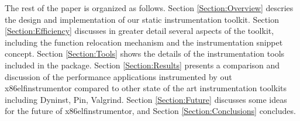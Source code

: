 The rest of the paper is organized as follows. Section
\ref{Section:Overview} descries the design and implementation of our static
instrumentation toolkit. Section \ref{Section:Efficiency} discusses in greater detail
several aspects of the toolkit, including the function relocation mechanism and the
instrumentation snippet concept. Section \ref{Section:Tools} shows the details of
the instrumentation tools included in the package. Section \ref{Section:Results}
presents a comparison and discussion of the performance applications instrumented by out x86elfinstrumentor compared
to other state of the art instrumentation toolkits including Dyninst, Pin, Valgrind. Section
\ref{Section:Future} discusses some ideas for the future of x86elfinstrumentor,
and Section \ref{Section:Conclusions} concludes.
